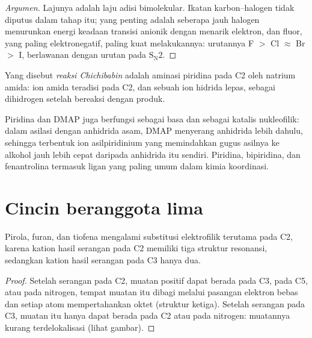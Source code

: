 \begin{proof}[Argumen]
Lajunya adalah laju adisi bimolekular. Ikatan karbon--halogen tidak
diputus dalam tahap itu; yang penting adalah seberapa jauh halogen menurunkan energi
keadaan transisi anionik dengan menarik elektron, dan fluor, yang paling
elektronegatif, paling kuat melakukannya: urutannya F $>$ Cl $\approx$ Br $>$ I, berlawanan dengan urutan pada $\mathrm S_\mathrm N2$.
\end{proof}

\begin{definition}\label{def:b3:heterocycles:chichibabin}
Yang disebut \emph{reaksi Chichibabin} adalah aminasi
piridina pada C2 oleh natrium amida: ion amida teradisi pada C2, dan sebuah ion hidrida
lepas, sebagai dihidrogen setelah bereaksi dengan produk.
\end{definition}

Piridina dan DMAP juga berfungsi sebagai basa dan sebagai katalis nukleofilik: dalam
asilasi dengan anhidrida asam, DMAP menyerang anhidrida lebih dahulu, sehingga terbentuk
ion asilpiridinium yang memindahkan gugus asilnya ke alkohol jauh lebih cepat daripada
anhidrida itu sendiri. Piridina, bipiridina, dan fenantrolina termasuk
ligan yang paling umum dalam kimia koordinasi.

\section{Cincin beranggota lima}

\begin{proposition}\label{prop:b3:heterocycles:pyrrole-c2}
Pirola, furan, dan tiofena mengalami substitusi elektrofilik terutama pada C2,
karena kation hasil serangan pada C2 memiliki tiga struktur resonansi, sedangkan kation
hasil serangan pada C3 hanya dua.
\end{proposition}

\begin{proof}
Setelah serangan pada C2, muatan positif dapat berada pada C3, pada C5, atau pada nitrogen,
tempat muatan itu dibagi melalui pasangan elektron bebas dan setiap atom mempertahankan oktet (struktur
ketiga). Setelah serangan pada C3, muatan itu hanya dapat berada pada C2 atau pada nitrogen: muatannya
kurang terdelokalisasi (lihat gambar).
\end{proof}

